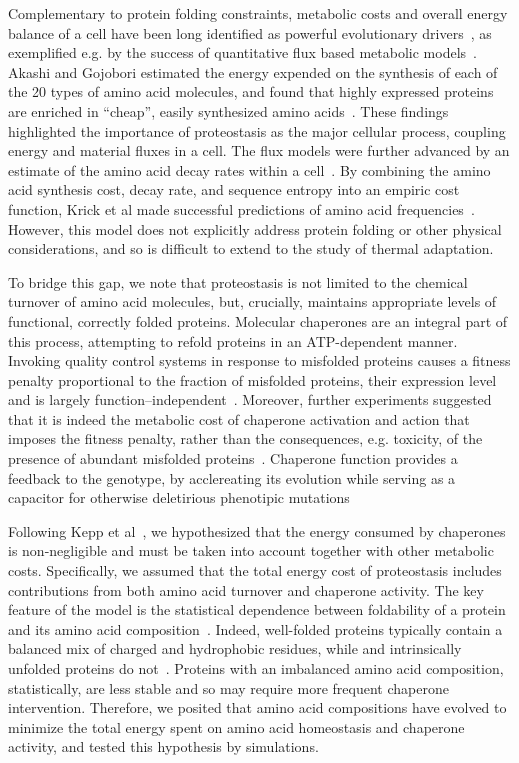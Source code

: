 \documentclass[10pt,letterpaper]{article}
\begin{document}
Complementary to protein folding constraints, metabolic costs and overall energy balance of a cell have been long identified as powerful evolutionary drivers~\cite{Pal2006An}, as exemplified e.g. by the success of quantitative flux based metabolic models~\cite{Varma1994Metabolic,Price2004Genome}. Akashi and Gojobori estimated the energy expended on the synthesis of each of the 20 types of amino acid molecules, and found that highly expressed proteins are enriched in ``cheap'', easily synthesized amino acids~\cite{Akashi2002Metabolic}. These findings highlighted the importance of proteostasis as the major cellular process, coupling energy and material fluxes in a cell. The flux models were further advanced by an estimate of the amino acid decay rates within a cell~\cite{Krick2014Amino}. By combining the amino acid synthesis cost, decay rate, and sequence entropy into an empiric cost function, Krick et al made successful predictions of amino acid frequencies~\cite{Krick2014Amino}. However, this model does not explicitly address protein folding or other physical considerations, and so is difficult to extend to the study of thermal adaptation.

To bridge this gap, we note that proteostasis is not limited to the chemical turnover of amino acid molecules, but, crucially, maintains appropriate levels of functional, correctly folded proteins. Molecular chaperones are an integral part of this process, attempting to refold proteins in an ATP-dependent manner. Invoking quality control systems in response to misfolded proteins causes a fitness penalty proportional to the fraction of misfolded proteins, their expression level and is largely function--independent~\cite{Samerotte2011Misfolded}. Moreover, further experiments suggested that it is indeed the metabolic cost of chaperone activation and action that imposes the fitness penalty, rather than the consequences, e.g. toxicity, of the presence of abundant misfolded proteins~\cite{Tomala2014Fitness}. Chaperone function provides a feedback to the genotype, by acclereating its evolution while serving as a capacitor for otherwise deletirious phenotipic mutations~\cite{Bogumil2012Cumulative,Cetinbas2013Catalysis}

Following Kepp et al~\cite{Kepp2014Model}, we hypothesized that the energy consumed by chaperones is non-negligible and must be taken into account together with other metabolic costs. Specifically, we assumed that the total energy cost of proteostasis includes contributions from both amino acid turnover and chaperone activity. The key feature of the model is the statistical dependence between foldability of a protein and its amino acid composition~\cite{Dill1985Theory,Berezovsky2007Positive,Venev2015Massively}. Indeed, well-folded proteins typically  contain a balanced mix of charged and hydrophobic residues, while and intrinsically unfolded proteins do not~\cite{Uversky2000Why}. Proteins with an imbalanced amino acid composition, statistically, are less stable and so may require more frequent chaperone intervention. Therefore, we posited that amino acid compositions have evolved to minimize the total energy spent on amino acid homeostasis and chaperone activity, and tested this hypothesis by simulations.
\end{document}
